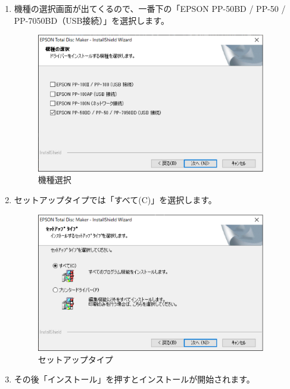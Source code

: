 \documentclass[11pt,a4paper]{jsarticle}
\begin{document}
\begin{enumerate}
\begin{figure}[H]
                        \end{figure}
                        \item 機種の選択画面が出てくるので、一番下の「EPSON PP-50BD / PP-50 / PP-7050BD（USB接続）」を選択します。
                        \begin{figure}[H]
                            \begin{center}
                            \includegraphics[width=10.0cm]{./image/tdm03.eps}
                            \caption{機種選択}
                            \label{fig:tdm03}
                            \end{center}
                        \end{figure}
                        \item セットアップタイプでは「すべて(C)」を選択します。
                        \begin{figure}[H]
                            \begin{center}
                            \includegraphics[width=10.0cm]{./image/tdm04.eps}
                            \caption{セットアップタイプ}
                            \label{fig:tdm04}
                            \end{center}
                        \end{figure}
                        \item その後「インストール」を押すとインストールが開始されます。

\end{enumerate}
\end{document}
